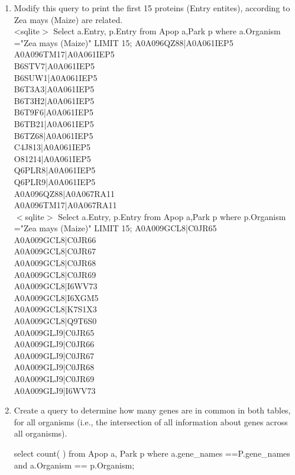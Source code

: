 \documentclass{report}
\begin{document}
\begin{enumerate}
\item Modify this query to print the first 15 proteins (Entry entites), according to
Zea mays (Maize) are related.\\
\textless sqlite$>$  Select a.Entry, p.Entry from Apop a,Park p where a.Organism ="Zea mays (Maize)" LIMIT 15;
A0A096QZ88|A0A061IEP5 \\
A0A096TM17|A0A061IEP5 \\
B6STV7|A0A061IEP5  \\
B6SUW1|A0A061IEP5  \\
B6T3A3|A0A061IEP5  \\
B6T3H2|A0A061IEP5  \\
B6T9F6|A0A061IEP5  \\
B6TB21|A0A061IEP5  \\
B6TZ68|A0A061IEP5  \\
C4J813|A0A061IEP5   \\
O81214|A0A061IEP5  \\
Q6PLR8|A0A061IEP5  \\
Q6PLR9|A0A061IEP5 \\
A0A096QZ88|A0A067RA11 \\
A0A096TM17|A0A067RA11  \\
$<$sqlite$>$  Select a.Entry, p.Entry from Apop a,Park p where p.Organism ="Zea mays (Maize)" LIMIT 15;
A0A009GCL8|C0JR65 \\
A0A009GCL8|C0JR66  \\
A0A009GCL8|C0JR67  \\
A0A009GCL8|C0JR68  \\
A0A009GCL8|C0JR69   \\
A0A009GCL8|I6WV73   \\
A0A009GCL8|I6XGM5   \\
A0A009GCL8|K7S1X3  \\
A0A009GCL8|Q9T6S0  \\
A0A009GLJ9|C0JR65  \\
A0A009GLJ9|C0JR66 \\
A0A009GLJ9|C0JR67 \\
A0A009GLJ9|C0JR68 \\
A0A009GLJ9|C0JR69 \\
A0A009GLJ9|I6WV73 \\
\item  Create a query to determine how many genes are in common in both tables, for all
organisms (i.e., the intersection of all information about genes across all organisms).

 select count( ) from Apop a, Park p where a.gene\_names ==P.gene\_names and a.Organism == p.Organism;     \\
 

\end{enumerate}
\end{document}
